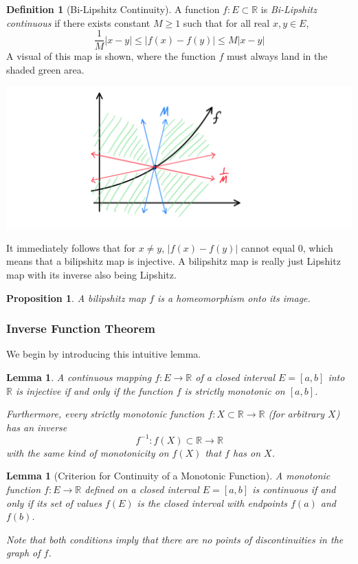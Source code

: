 \documentclass{article}
\newtheorem{proposition}[theorem]{Proposition}
\newtheorem{lemma}[theorem]{Lemma}
\theoremstyle{remark}
\theoremstyle{definition}
\newtheorem{definition}{Definition}[section]
\begin{document}
\begin{definition}[Bi-Lipshitz Continuity]
A function $f: E \subset \mathbb{R}$ is \textit{Bi-Lipshitz continuous} if there exists constant $M\geq 1$ such that for all real $x, y \in E$, 
\[ \frac{1}{M} |x - y| \leq |f(x) - f(y)| \leq M |x - y|\]
A visual of this map is shown, where the function $f$ must always land in the shaded green area. 
\begin{center}
    \includegraphics[scale=0.3]{img/BiLipshitz_Map.PNG}
\end{center}
It immediately follows that for $x \neq y$, $ |f(x) - f(y)|$ cannot equal $0$, which means that a bilipshitz map is injective. A bilipshitz map is really just Lipshitz map with its inverse also being Lipshitz. 
\end{definition}

\begin{proposition}
A bilipshitz map $f$ is a homeomorphism onto its image. 
\end{proposition}

\subsubsection{Inverse Function Theorem}

We begin by introducing this intuitive lemma. 
\begin{lemma}
A continuous mapping $f: E \longrightarrow \mathbb{R}$ of a closed interval $E = [a,b]$ into $\mathbb{R}$ is injective if and only if the function $f$ is strictly monotonic on $[a,b]$. 

Furthermore, every strictly monotonic function $f: X \subset \mathbb{R} \longrightarrow \mathbb{R}$ (for arbitrary $X$) has an inverse 
\[f^{-1}: f(X) \subset \mathbb{R} \longrightarrow \mathbb{R}\]
with the same kind of monotonicity on $f(X)$ that $f$ has on $X$. 
\end{lemma}

\begin{lemma}[Criterion for Continuity of a Monotonic Function]
A monotonic function $f: E \longrightarrow \mathbb{R}$ defined on a closed interval $E = [a,b]$ is continuous if and only if its set of values $f(E)$ is the closed interval with endpoints $f(a)$ and $f(b)$. 

Note that both conditions imply that there are no points of discontinuities in the graph of $f$. 
\end{lemma}
\end{document}
